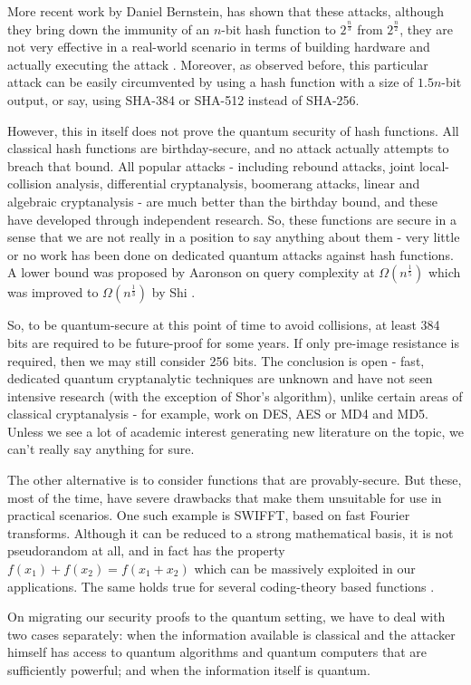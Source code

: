 \documentclass[10pt,a4paper]{article}
\begin{document}
More recent work by Daniel Bernstein, has shown that these attacks, although they bring down the immunity of an $n$-bit hash function to $2^{\frac{n}{3}}$ from $2^{\frac{n}{2}}$, they are not very effective in a real-world scenario in terms of building hardware and actually executing the attack \cite{dan}. Moreover, as observed before, this particular attack can be easily circumvented by using a hash function with a size of $1.5n$-bit output, or say, using SHA-384 or SHA-512 instead of SHA-256.

However, this in itself does not prove the quantum security of hash functions. All classical hash functions are birthday-secure, and no attack actually attempts to breach that bound. All popular attacks - including rebound attacks, joint local-collision analysis, differential cryptanalysis, boomerang attacks, linear and algebraic cryptanalysis - are much better than the birthday bound, and these have developed through independent research. So, these functions are secure in a sense that we are not really in a position to say anything about them - very little or no work has been done on dedicated quantum attacks against hash functions. A lower bound was proposed by Aaronson on query complexity at $\Omega(n^{\frac{1}{5}})$ \cite{aar} which was improved to $\Omega(n^{\frac{1}{3}})$ by Shi \cite{shi}.

So, to be quantum-secure at this point of time to avoid collisions, at least 384 bits are required to be future-proof for some years. If only pre-image resistance is required, then we may still consider 256 bits. The conclusion is open - fast, dedicated quantum cryptanalytic techniques are unknown and have not seen intensive research (with the exception of Shor's algorithm), unlike certain areas of classical cryptanalysis - for example, work on DES, AES or MD4 and MD5. Unless we see a lot of academic interest generating new literature on the topic, we can't really say anything for sure.

The other alternative is to consider functions that are provably-secure. But these, most of the time, have severe drawbacks that make them unsuitable for use in practical scenarios. One such example is SWIFFT, based on fast Fourier transforms. Although it can be reduced to a strong mathematical basis, it is not pseudorandom at all, and in fact has the property $f(x_1) + f(x_2) = f(x_1 + x_2)$ which can be massively exploited in our applications. The same holds true for several coding-theory based functions \cite{NCB}.

On migrating our security proofs to the quantum setting, we have to deal with two cases separately: when the information available is classical and the attacker himself has access to quantum algorithms and quantum computers that are sufficiently powerful; and when the information itself is quantum.
\end{document}

